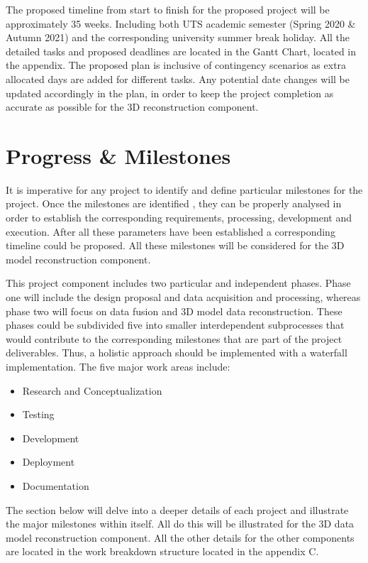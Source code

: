 \documentclass[12pt]{report}
\begin{document}
  
The proposed timeline from start to  finish for the proposed project  will be approximately  35 weeks. Including both UTS academic semester (Spring 2020 \& Autumn 2021) and the corresponding university summer break holiday.
All the detailed tasks and proposed deadlines are located in the Gantt Chart, located in the appendix.
The proposed plan is inclusive of contingency scenarios as extra allocated days are added for different tasks. Any potential date changes will be updated accordingly in the plan, in order to keep the project completion as accurate as possible for the 3D reconstruction component.  



\section{Progress \& Milestones}
It is imperative for any project to identify and define particular milestones for the project. 
Once the milestones are identified , they can be properly analysed in order to establish the corresponding requirements, processing, development and execution. 
After all these parameters have been established a corresponding timeline could be proposed. All these milestones will be considered  for the 3D model reconstruction component. 

This project component includes two particular and independent phases. 
Phase one will include the design proposal and data acquisition and processing, whereas phase two will focus on data fusion and 3D model data reconstruction.  
These phases could be subdivided five into smaller interdependent subprocesses that would contribute to the corresponding milestones that are part of the project deliverables. 
Thus, a holistic approach should be implemented with a waterfall implementation. The five major work areas include:
\begin{itemize}
  \item Research and Conceptualization
  \item Testing 
  \item Development
  \item Deployment 
  \item Documentation
\end{itemize}

The section below will delve into a deeper details of each project and illustrate the major milestones within itself. All do this will be illustrated for the 3D data model reconstruction component. 
All the other details for the other components are located in the work breakdown structure located in the appendix C. 
\end{document}
